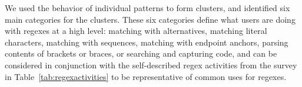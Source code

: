 We used the behavior of individual patterns to form clusters, and identified six main categories for the clusters.
These six categories define what users are doing with regexes at a high level: matching with alternatives, matching literal characters, matching with sequences, matching with endpoint anchors, parsing contents of brackets or braces, or searching and capturing code, and can be considered in conjunction with the self-described regex activities from the survey in Table~\ref{tab:regexactivities} to be representative of common uses for regexes.


